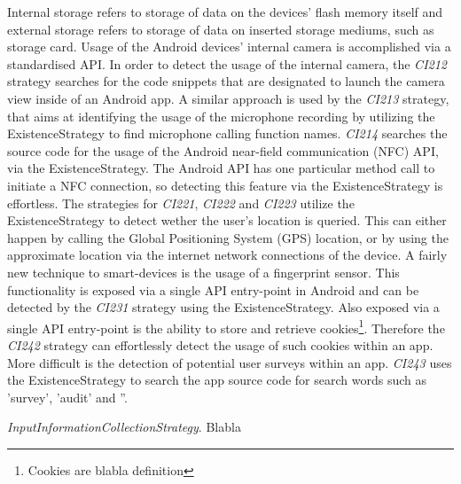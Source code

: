 Internal storage refers to storage of data on the devices' flash memory itself and external storage refers to storage of data on inserted storage mediums, such as storage card.
Usage of the Android devices' internal camera is accomplished via a standardised \acs{API}.
In order to detect the usage of the internal camera, the \textit{CI212} strategy searches for the code snippets that are designated to launch the camera view inside of an Android app.
A similar approach is used by the \textit{CI213} strategy, that aims at identifying the usage of the microphone recording by utilizing the ExistenceStrategy to find microphone calling function names.
\textit{CI214} searches the source code for the usage of the Android near-field communication (\acs{NFC}) API, via the ExistenceStrategy.
The Android API has one particular method call to initiate a NFC connection, so detecting this feature via the ExistenceStrategy is effortless.
The strategies for \textit{CI221}, \textit{CI222} and \textit{CI223} utilize the ExistenceStrategy to detect wether the user's location is queried.
This can either happen by calling the Global Positioning System (\acs{GPS}) location, or by using the approximate location via the internet network connections of the device.
A fairly new technique to smart-devices is the usage of a fingerprint sensor. 
This functionality is exposed via a single API entry-point in Android and can be detected by the \textit{CI231} strategy using the ExistenceStrategy.
Also exposed via a single API entry-point is the ability to store and retrieve cookies\footnote{Cookies are blabla definition}.
Therefore the \textit{CI242} strategy can effortlessly detect the usage of such cookies within an app.
More difficult is the detection of potential user surveys within an app.
\textit{CI243} uses the ExistenceStrategy to search the app source code for search words such as 'survey', 'audit' and ''.

\textit{InputInformationCollectionStrategy}. Blabla











